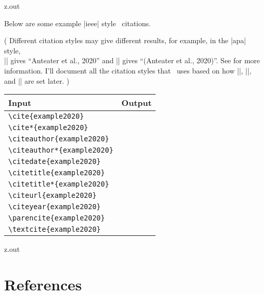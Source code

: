 \MyIO


\begin{VerbatimOut}{z.out}

Below are some example |ieee| style \BibLaTeXLogo\ citations.
  
(%
  Different citation styles may give different results,
  for example,
  in the |apa| style,\\
  |\cite{example2020}|
  gives
  ``Anteater et al., 2020''
  and
  |\parencite{example2020}|
  gives
  ``(Anteater et al., 2020)''.
  See
  \cite{apa-style-examples}
  for more information.
  I'll document all the citation styles
  that \PurdueThesisLogo\ uses based on how
  |\ZZinstitution|,
  |\ZZcampus|,
  and |\ZZprogram| are set later.%
)

\begin{inlinetable}
  \begin{tabular}{@{}ll@{}}
    \toprule
    \textbf{Input}&                   \textbf{Output}\\
    \midrule
    \verb+\cite{example2020}+&        \cite{example2020}\\
    \verb+\cite*{example2020}+&       \cite*{example2020}\\
    \verb+\citeauthor{example2020}+&  \citeauthor{example2020}\\
    \verb+\citeauthor*{example2020}+& \citeauthor*{example2020}\\
    \verb+\citedate{example2020}+&    \citedate{example2020}\\
    \verb+\citetitle{example2020}+&   \citetitle{example2020}\\
    \verb+\citetitle*{example2020}+&  \citetitle*{example2020}\\
    \verb+\citeurl{example2020}+&     \citeurl{example2020}\\
    \verb+\citeyear{example2020}+&    \citeyear{example2020}\\
    \verb+\parencite{example2020}+&   \parencite{example2020}\\
    \verb+\textcite{example2020}+&    \textcite{example2020}\\
    \bottomrule
  \end{tabular}
\end{inlinetable}
\end{VerbatimOut}

\MyIO


\begin{VerbatimOut}{z.out}


\section{References}
\end{VerbatimOut}


